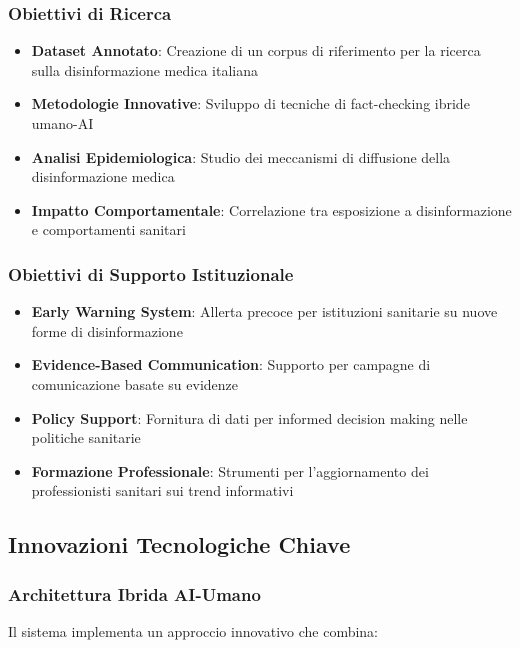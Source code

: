 \documentclass[12pt,a4paper]{report}
\begin{document}
\subsubsection{Obiettivi di Ricerca}

\begin{itemize}
    \item \textbf{Dataset Annotato}: Creazione di un corpus di riferimento per la ricerca sulla disinformazione medica italiana
    \item \textbf{Metodologie Innovative}: Sviluppo di tecniche di fact-checking ibride umano-AI
    \item \textbf{Analisi Epidemiologica}: Studio dei meccanismi di diffusione della disinformazione medica
    \item \textbf{Impatto Comportamentale}: Correlazione tra esposizione a disinformazione e comportamenti sanitari
\end{itemize}

\subsubsection{Obiettivi di Supporto Istituzionale}

\begin{itemize}
    \item \textbf{Early Warning System}: Allerta precoce per istituzioni sanitarie su nuove forme di disinformazione
    \item \textbf{Evidence-Based Communication}: Supporto per campagne di comunicazione basate su evidenze
    \item \textbf{Policy Support}: Fornitura di dati per informed decision making nelle politiche sanitarie
    \item \textbf{Formazione Professionale}: Strumenti per l'aggiornamento dei professionisti sanitari sui trend informativi
\end{itemize}

\subsection{Innovazioni Tecnologiche Chiave}

\subsubsection{Architettura Ibrida AI-Umano}

Il sistema implementa un approccio innovativo che combina:
\end{document}
